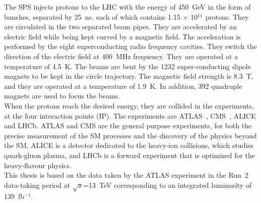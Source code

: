 The SPS injects protons to the LHC with the energy of 450~GeV in the form of bunches, separated by 25~ns, each of which contains 1.15 $\times$ 10$^{11}$ protons. They are circulated in the two separated beam pipes. They are accelerated by an electric field while being kept curved by a magnetic field. The acceleration is performed by the eight superconducting radio frequency cavities. 
They switch the direction of the electric field at 400~MHz frequency.
They are operated at a temperature of 4.5~K. The beams are bent by the 1232 super-conducting dipole magnets to be kept in the circle trajectory. The magnetic field strength is 8.3~T, and they are operated at a temperature of 1.9~K. In addition, 392 quadruple magnets are used to focus the beams. \\
When the protons reach the desired energy, they are collided in the experiments, at the four interaction points (IP). 
The experiments are ATLAS~\cite{PERF-2007-01}, CMS~\cite{CMS-TDR-08-001}, ALICE and LHCb. 
ATLAS and CMS are the general purpose experiments, for both the precise measurement of the SM processes and the discovery of the physics beyond the SM, ALICE is a detector dedicated to the heavy-ion collisions, which studies quark-gluon plasma, and LHCb is a forward experiment that is optimized for the heavy-flavour physics. \\
This thesis is based on the data taken by the ATLAS experiment in the Run~2 data-taking period at $\sqrt{s}$=13~TeV corresponding to an integrated luminosity of 139~fb$^{-1}$.
